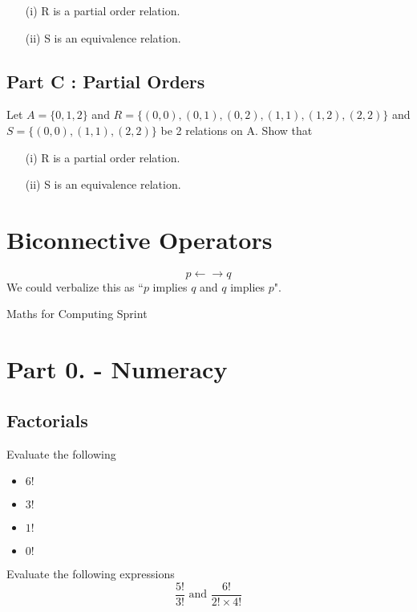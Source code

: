 \documentclass[]{report}
\begin{document}
\begin{itemize}
	\item[(i)] R is a partial order relation.
	\item[(ii)] S is an equivalence relation.
\end{itemize}

\subsection*{Part C : Partial Orders}

Let $A=\{0,1,2\}$ and $R=\{ (0,0),(0,1),(0,2),(1,1), (1,2), (2,2)\}$
and $S=\{(0,0),(1,1),(2,2)\}$ be 2 relations on A. Show that

\begin{itemize}
	\item[(i)] R is a partial order relation.
	\item[(ii)] S is an equivalence relation.
\end{itemize}




\section*{Biconnective Operators}

\[ p \leftarrow \rightarrow q\]
We could verbalize this as ``$p$ implies $q$ and $q$ implies $p$".




Maths for Computing Sprint

\section*{Part 0. - Numeracy}
\subsection{Factorials}
Evaluate the following
\begin{itemize}
	\item $6!$
	\item $3!$
	\item $1!$
	\item $0!$
\end{itemize}
Evaluate the following expressions
\[  \frac{5!}{3!}  \mbox{   and   } \frac{6!}{2!\times 4!}  \]
\end{document}
